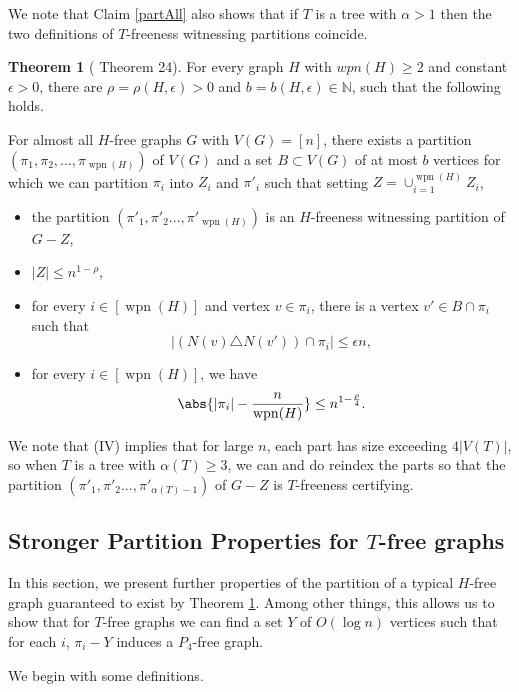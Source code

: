 \documentclass[12pt]{article}
\theoremstyle{definition}
\newtheorem{theorem}{Theorem}[section]
\DeclareMathOperator{\wpn}{wpn}
\begin{document}
We note that Claim \ref{partAll}  also shows that if $T$ is a tree  with $\alpha>1$ then the two definitions of 
$T$-freeness witnessing partitions coincide. 



\begin{theorem} [ \cite{R} Theorem 24] \label{thmRS}
For every graph $H$ with $wpn(H) \ge 2$ and constant $\epsilon>0$, there are $\rho=\rho(H,\epsilon)>0$ and $b=b(H,\epsilon)\in \mathbb{N}$, such that the following holds. 

For almost all $H$-free graphs $G$ with $V(G)=[n]$, there exists a partition $(\pi_1,\pi_2,...,\pi_{\wpn(H)})$ of $V(G)$ 
and a set $B\subset V(G)$ of at most $b$ vertices for which 
  we can partition
$\pi_i$ into  $Z_i$  and $\pi'_i$  such that setting 
$Z=\cup_{i=1}^{\wpn(H)} Z_i$,
\begin{itemize}
\item [(I)] the partition $(\pi'_1,\pi'_2...,\pi'_{\wpn(H)})$ is  an $H$-freeness witnessing   partition of $G-Z$,
\item [(II)] $|Z|\le n^{1-\rho}$, 
\item [(III)] for every $i\in [\wpn(H)]$ and vertex $v\in \pi_i$, there is a vertex $v' \in B \cap \pi_i$ 
such that $$\big\vert \left(N(v)\triangle N(v')\right) \cap\pi_i\big\vert \le \epsilon n,$$
\item [(IV)] for every $i\in [\wpn(H)]$, we have $$\abs{ |\pi_i|-\frac{n}{\wpn(H)}} \le n^{1-\frac{\rho}{4}}.$$
\end{itemize} 
\end{theorem}  

We note that (IV) implies that for large $n$, each part has size exceeding $4|V(T)|$, so when $T$ is a tree with $\alpha(T) \ge 3$, we can and do reindex the parts   so that the partition $(\pi'_1,\pi'_2...,\pi'_{\alpha(T)-1})$ of $G-Z$ is 
$T$-freeness certifying. 

\subsection{Stronger Partition Properties for $T$-free graphs}

In this section, we present further properties of the partition of a typical  $H$-free graph 
guaranteed to exist by Theorem \ref{thmRS}. Among other things, this allows us to show that for $T$-free graphs 
we can find a set $Y$ of $O(\log n)$ vertices such that for each $i$, $\pi_i-Y$ 
induces a $P_4$-free graph. 

We begin with some definitions. 
\end{document}
